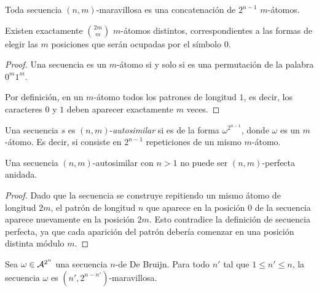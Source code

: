 \documentclass[11pt]{article}
\begin{document}
\begin{remark}
	Toda secuencia $(n,m)$-maravillosa es una concatenación de $2^{n-1}$
	$m$-átomos.
\end{remark}

\begin{proposition}
	Existen exactamente $\binom{2m}{m}$ $m$-átomos distintos, correspondientes a
	las formas de elegir las $m$ posiciones que serán ocupadas por el símbolo
	$0$.
\end{proposition}

\begin{proof}
	Una secuencia es un $m$-átomo si y solo si es una permutación de la palabra
	$0^m1^m$.

	Por definición, en un $m$-átomo todos los patrones de longitud $1$, es
	decir, los caracteres $0$ y $1$ deben aparecer exactamente $m$ veces.
\end{proof}


\begin{definition}
	Una secuencia $s$ es $(n,m)$-\emph{autosimilar} si es de la forma
	$\omega^{2^{n-1}}$, donde $\omega$ es un $m$-átomo. Es decir, si consiste
	en $2^{n-1}$ repeticiones de un mismo $m$-átomo.
\end{definition}

\begin{remark}
	\label{lemma:autosimilar-cannot-be-np}
	Una secuencia $(n,m)$-autosimilar con $n > 1$ no puede ser $(n,m)$-perfecta
	anidada.
\end{remark}

\begin{proof}
	Dado que la secuencia se construye repitiendo %
	un mismo
	átomo de longitud $2m$, el patrón de longitud $n$ que aparece en la posición
	$0$ de la secuencia aparece nuevamente en la posición $2m$. Esto contradice
	la definición de secuencia perfecta, ya que cada aparición del patrón debería
	comenzar en una posición distinta módulo $m$.
\end{proof}

\begin{lemma}
	Sea $\omega \in \mathcal{A}^{2^n}$ una secuencia $n$-de De Bruijn. Para todo
	$n'$ tal que $1 \leq n' \leq n$, la secuencia $\omega$ es
	$(n',2^{n-n'})$-maravillosa.
\end{lemma}
\end{document}
